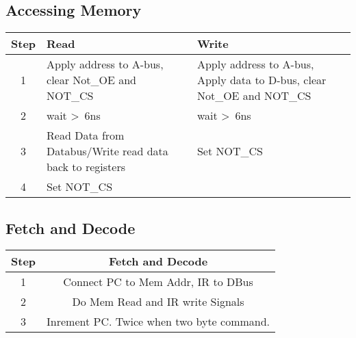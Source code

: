 \documentclass[a4paper, 12pt]{article}
\begin{document}
	\subsection{Accessing Memory}
	\begin{center}
		\begin{tabular}{|c|p{6cm}|p{6cm}|}
			\hline
			Step & Read & Write \\ \hline
			1 & Apply address to A-bus, clear Not\_OE and NOT\_CS & Apply address to A-bus, Apply data to D-bus, clear Not\_OE and NOT\_CS \\ \hline
			2 & wait \textgreater\ 6ns  & wait \textgreater\ 6ns \\ \hline
			3 & Read Data from Databus/Write read data back to registers & Set NOT\_CS \\ \hline
			4 & Set NOT\_CS  & \\ \hline
		\end{tabular}
	\end{center}
	\subsection{Fetch and Decode}
	\begin{center}
		\begin{tabular}{|c|c|}
			\hline
			Step & Fetch and Decode \\ \hline
			1 & Connect PC to Mem Addr, IR to DBus \\ \hline
			2 & Do Mem Read and IR write Signals \\ \hline
			3 & Inrement PC. Twice when two byte command.\\ \hline
		\end{tabular}
	\end{center}	
	\newpage
\end{document}
